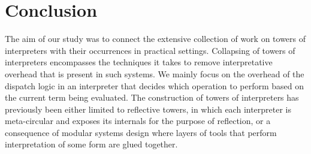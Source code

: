 \documentclass[a4paper,12pt,twoside,openright]{report}
\theoremstyle{definition}
\begin{document}


\section{Conclusion}\label{sec:conclusion}
The aim of our study was to connect the extensive collection of work on towers of interpreters with their occurrences in practical settings. Collapsing of towers of interpreters encompasses the techniques it takes to remove interpretative overhead that is present in such systems. We mainly focus on the overhead of the dispatch logic in an interpreter that decides which operation to perform based on the current term being evaluated. The construction of towers of interpreters has previously been either limited to reflective towers, in which each interpreter is meta-circular and exposes its internals for the purpose of reflection, or a consequence of modular systems design where layers of tools that perform interpretation of some form are glued together.
\end{document}
